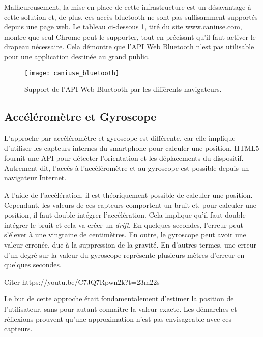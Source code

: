 Malheureusement, la mise en place de cette infrastructure est un désavantage à cette solution et, de plus, ces accès bluetooth ne sont pas suffisamment supportés depuis une page web. Le tableau ci-dessous \ref{caniuse-bluetooth}, tiré du site www.caniuse.com, montre que seul Chrome peut le supporter, tout en précisant qu'il faut activer le drapeau nécessaire. Cela démontre que l'API Web Bluetooth n'est pas utilisable pour une application destinée au grand public.

\begin{figure}[h!]
	\center
	\texttt{[image: caniuse\_bluetooth]}
	\caption{Support de l'API Web Bluetooth par les différents navigateurs.}
	\label{caniuse-bluetooth}
\end{figure}

\subsection{Accéléromètre et Gyroscope}
L'approche par accéléromètre et gyroscope est différente, car elle implique d'utiliser les capteurs internes du smartphone pour calculer une position. HTML5 fournit une API pour détecter l'orientation et les déplacements du dispositif. Autrement dit, l'accès à l'accéléromètre et au gyroscope est possible depuis un navigateur Internet.

A l'aide de l'accélération, il est théoriquement possible de calculer une position. Cependant, les valeurs de ces capteurs comportent un bruit et, pour calculer une position, il faut double-intégrer l'accélération. Cela implique qu'il faut double-intégrer le bruit et cela va créer un \textit{drift}. En quelques secondes, l'erreur peut s'élever à une vingtaine de centimètres. En outre, le gyroscope peut avoir une valeur erronée, due à la suppression de la gravité. En d'autres termes, une erreur d'un degré sur la valeur du gyroscope représente plusieurs mètres d'erreur en quelques secondes. 

Citer https://youtu.be/C7JQ7Rpwn2k?t=23m22s

Le but de cette approche était fondamentalement d'estimer la position de l'utilisateur, sans pour autant connaître la valeur exacte. Les démarches et réflexions prouvent qu'une approximation n'est pas envisageable avec ces capteurs.